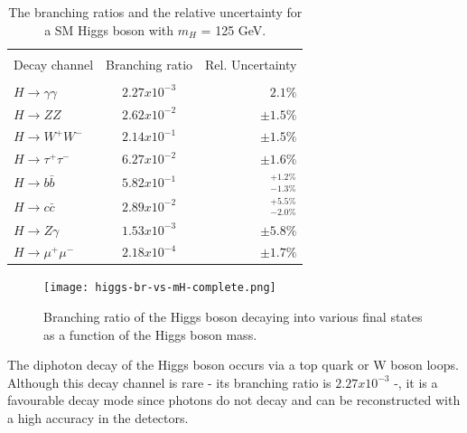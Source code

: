 \begin{table}[ht]
	{\setlength{\tabcolsep}{14pt}
		\caption[The branching ratios and the relative uncertainty for a SM Higgs boson with $m_H$ = 125 GeV.]{The branching ratios and the relative uncertainty for a SM Higgs boson with $m_H$ = 125 GeV\cite{higgs-br-vs-mH, higg-phen-3}.}
		\begin{center}
			\vspace{-6mm}
			\begin{tabular}{lcr}
				\hline \\[-2.45ex] \hline \\[-2.1ex]
				Decay channel & Branching ratio & Rel. Uncertainty \\
				\hline \\[-1.8ex]
                $H\rightarrow \gamma\gamma$ & $2.27x10^{-3}$ & $2.1\%$\\
                $H\rightarrow ZZ$ & $2.62x10^{-2}$ & $\pm 1.5\%$\\
                $H\rightarrow W^+W^-$ & $2.14x10^{-1}$ &$\pm 1.5\%$ \\
                $H\rightarrow \tau^+\tau^-$ & $6.27x10^{-2}$ &$\pm 1.6\%$ \\
                $H\rightarrow b\bar b$ & $5.82x10^{-1}$ & $^{+1.2\%}_{-1.3\%}$\\
                $H\rightarrow c \bar c$ & $2.89x10^{-2}$ &$^{+5.5\%}_{-2.0\%}$ \\
                $H\rightarrow Z\gamma$ & $1.53x10^{-3}$ & $\pm 5.8\%$\\
                $H\rightarrow \mu^+\mu^-$ & $2.18x10^{-4}$ &$\pm 1.7\%$ \\
				\hline
			\end{tabular}
			\vspace{-6mm}
		\end{center}
		\label{HiggsBRtable}}
\end{table}

\begin{figure}[ht]
	\centering
	\texttt{[image: higgs-br-vs-mH-complete.png]}
	\caption[Branching ratio of the Higgs boson decaying into various final states as a function of the Higgs boson mass.]{Branching ratio of the Higgs boson decaying into various final states as a function of the Higgs boson mass\cite{higg-phen-3}.}
	\label{higgs-br-vs-mH-complete}
\end{figure}


The diphoton decay of the Higgs boson occurs via a top quark or W boson loops. Although this decay channel is rare - its branching ratio is $2.27x10^{-3}$ -, it is a favourable decay mode since photons do not decay and can be reconstructed with a high accuracy in the detectors.

